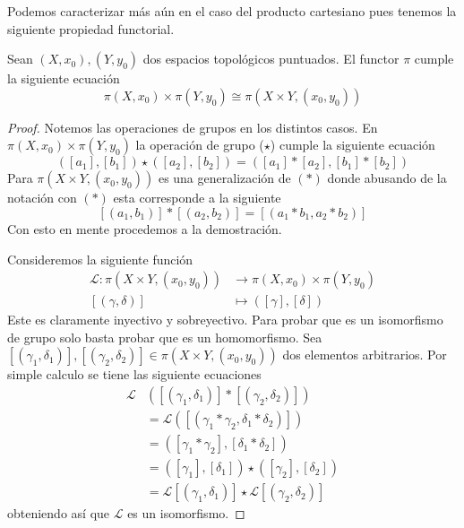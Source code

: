 Podemos caracterizar más aún en el caso del producto cartesiano pues
tenemos la siguiente propiedad functorial.

\begin{teorema}
  Sean \((X, x_0), (Y,y_0)\) dos espacios topológicos puntuados. El
  functor \(\pi\) cumple la siguiente ecuación
  \[ \pi (X, x_0) \times \pi (Y, y_0) \cong \pi (X \times Y, (x_0, y_0)) \]
\end{teorema}
\begin{proof}
  Notemos las operaciones de grupos en los distintos casos. En \(\pi(X,
  x_0) \times \pi (Y, y_0)\) la operación de grupo (\(\star\)) cumple la
  siguiente ecuación
  \[ ([a_1],[b_1]) \star ([a_2], [b_2]) = ([a_1] * [a_2] , [b_1] *
    [b_2]) \]
  Para \(\pi (X \times Y , (x_0, y_0))\) es una generalización de
  \((*)\) donde abusando de la notación con \((*)\) esta corresponde a
  la siguiente
  \[ [(a_1, b_1)] * [(a_2, b_2)] = [(a_1 * b_1 , a_2 * b_2)] \]
  Con esto en mente procedemos a la demostración.

  Consideremos la siguiente función
  \begin{align*}
    \mathcal L : \pi (X \times Y , (x_0, y_0)) &\longrightarrow \pi (X,
        x_0) \times \pi (Y, y_0) \\
    [(\gamma, \delta)] &\longmapsto ([\gamma], [\delta])
  \end{align*}
  Este es claramente inyectivo y sobreyectivo. Para probar que es un
  isomorfismo de grupo solo basta probar que es un homomorfismo. Sea
  \([(\gamma_1, \delta_1)], [(\gamma_2, \delta_2)] \in \pi (X \times Y ,
  (x_0, y_0))\) dos elementos arbitrarios. Por simple calculo se tiene
  las siguiente ecuaciones
  \begin{align*}
    \mathcal L &\left( [(\gamma_1, \delta_1)] * [(\gamma_2, \delta_2)] \right) \\
    &= \mathcal L \left( [(\gamma_1 * \gamma_2 , \delta_1 * \delta_2)] \right) \\
    &= ([\gamma_1 * \gamma_2] , [\delta_1 * \delta_2]) \\
    &= ([\gamma_1] , [\delta_1]) \star ([\gamma_2] , [\delta_2]) \\
    &= \mathcal L [(\gamma_1 , \delta_1)] \star \mathcal L [(\gamma_2 ,
      \delta_2)]
  \end{align*}
  obteniendo así que \(\mathcal L\) es un isomorfismo.
\end{proof}

